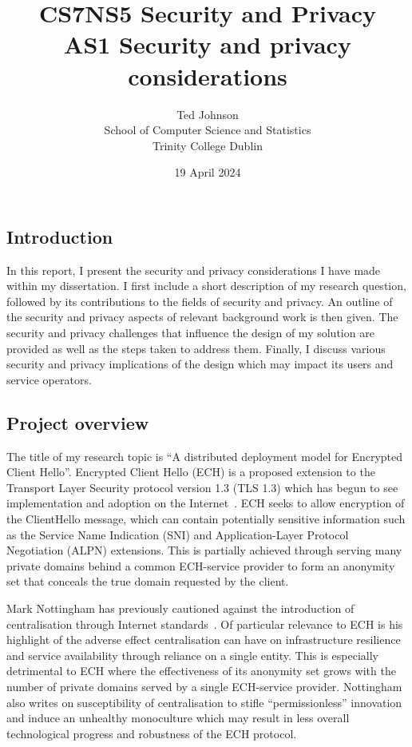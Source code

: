 \documentclass[a4paper,oneside,12pt]{article}
\title{CS7NS5 Security and Privacy\\AS1 Security and privacy considerations}
\author{Ted Johnson\\School of Computer Science and Statistics\\Trinity College Dublin}
\date{19 April 2024}
\begin{document}
\maketitle
\onehalfspacing

\subsection*{Introduction}

In this report, I present the security and privacy considerations I have made within my dissertation. I first include a short description of my research question, followed by its contributions to the fields of security and privacy. An outline of the security and privacy aspects of relevant background work is then given. The security and privacy challenges that influence the design of my solution are provided as well as the steps taken to address them. Finally, I discuss various security and privacy implications of the design which may impact its users and service operators.

\subsection*{Project overview}

The title of my research topic is ``A distributed deployment model for Encrypted Client Hello''. Encrypted Client Hello (ECH) is a proposed extension to the Transport Layer Security protocol version 1.3 (TLS 1.3) which has begun to see implementation and adoption on the Internet~\cite{tsiatsikas2022measuring, CF-ECH}. ECH seeks to allow encryption of the ClientHello message, which can contain potentially sensitive information such as the Service Name Indication (SNI) and Application-Layer Protocol Negotiation (ALPN) extensions. This is partially achieved through serving many private domains behind a common ECH-service provider to form an anonymity set that conceals the true domain requested by the client.

Mark Nottingham has previously cautioned against the introduction of centralisation through Internet standards~\cite{rfc9518}. Of particular relevance to ECH is his highlight of the adverse effect centralisation can have on infrastructure resilience and service availability through reliance on a single entity. This is especially detrimental to ECH where the effectiveness of its anonymity set grows with the number of private domains served by a single ECH-service provider. Nottingham also writes on susceptibility of centralisation to stifle ``permissionless'' innovation and induce an unhealthy monoculture which may result in less overall technological progress and robustness of the ECH protocol.
\end{document}

